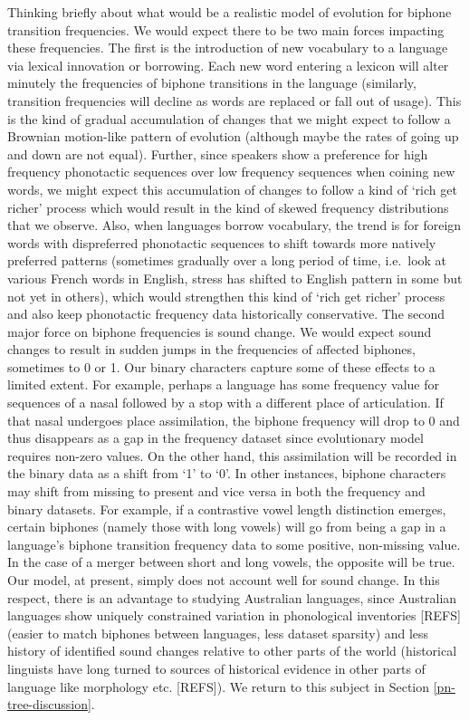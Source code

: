 \documentclass[]{article}
\begin{document}
Thinking briefly about what would be a realistic model of evolution for biphone transition frequencies. We would expect there to be two main forces impacting these frequencies. The first is the introduction of new vocabulary to a language via lexical innovation or borrowing. Each new word entering a lexicon will alter minutely the frequencies of biphone transitions in the language (similarly, transition frequencies will decline as words are replaced or fall out of usage). This is the kind of gradual accumulation of changes that we might expect to follow a Brownian motion-like pattern of evolution (although maybe the rates of going up and down are not equal). Further, since speakers show a preference for high frequency phonotactic sequences over low frequency sequences when coining new words, we might expect this accumulation of changes to follow a kind of `rich get richer' process which would result in the kind of skewed frequency distributions that we observe. Also, when languages borrow vocabulary, the trend is for foreign words with dispreferred phonotactic sequences to shift towards more natively preferred patterns (sometimes gradually over a long period of time, i.e.~look at various French words in English, stress has shifted to English pattern in some but not yet in others), which would strengthen this kind of `rich get richer' process and also keep phonotactic frequency data historically conservative. The second major force on biphone frequencies is sound change. We would expect sound changes to result in sudden jumps in the frequencies of affected biphones, sometimes to 0 or 1. Our binary characters capture some of these effects to a limited extent. For example, perhaps a language has some frequency value for sequences of a nasal followed by a stop with a different place of articulation. If that nasal undergoes place assimilation, the biphone frequency will drop to 0 and thus disappears as a gap in the frequency dataset since evolutionary model requires non-zero values. On the other hand, this assimilation will be recorded in the binary data as a shift from `1' to `0'. In other instances, biphone characters may shift from missing to present and vice versa in both the frequency and binary datasets. For example, if a contrastive vowel length distinction emerges, certain biphones (namely those with long vowels) will go from being a gap in a language's biphone transition frequency data to some positive, non-missing value. In the case of a merger between short and long vowels, the opposite will be true. Our model, at present, simply does not account well for sound change. In this respect, there is an advantage to studying Australian languages, since Australian languages show uniquely constrained variation in phonological inventories {[}REFS{]} (easier to match biphones between languages, less dataset sparsity) and less history of identified sound changes relative to other parts of the world (historical linguists have long turned to sources of historical evidence in other parts of language like morphology etc. {[}REFS{]}). We return to this subject in Section \ref{pn-tree-discussion}.
\end{document}
